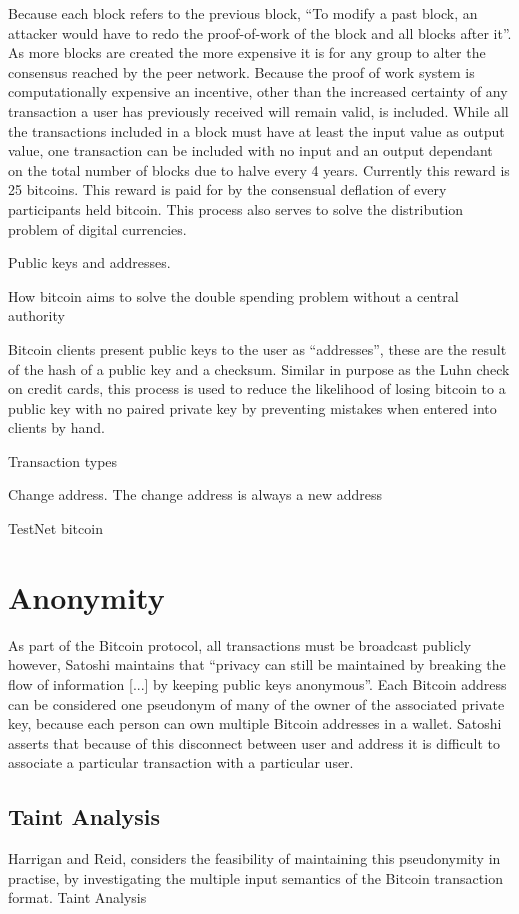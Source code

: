 Because each block refers to the previous block, “To modify a past block, an attacker would have to redo the proof-of-work of the block and all blocks after it”.  As more blocks are created the more expensive it is for any group to alter the consensus reached by the peer network.  Because the proof of work system is computationally expensive an incentive, other than the increased certainty of any transaction a user has previously received will remain valid, is included.  While all the transactions included in a block must have at least the input value as output value, one transaction can be included with no input and an output dependant on the total number of blocks due to halve every 4 years. Currently this reward is 25 bitcoins. This reward is paid for by the consensual deflation of every participants held bitcoin. This process also serves to solve the distribution problem of digital currencies.


    Public keys and addresses.

    How bitcoin aims to solve the double spending problem without a central authority

    Bitcoin clients present public keys to the user as “addresses”, these are the result of the hash of a public key and a checksum. Similar in purpose as the Luhn check on credit cards, this process is used to reduce the likelihood of losing bitcoin to a public key with no paired private key by preventing mistakes when entered into clients by hand.

    Transaction types

    Change address. The change address is always a new address

    TestNet bitcoin

\section{Anonymity}
As part of the Bitcoin protocol, all transactions must be broadcast publicly however, Satoshi maintains that “privacy can still be maintained by breaking the flow of information [...] by keeping public keys anonymous”.  Each Bitcoin address can be considered one pseudonym of many of the owner of the associated private key, because each person can own multiple Bitcoin addresses in a wallet. Satoshi asserts that because of this disconnect between user and address it is difficult to associate a particular transaction with a particular user.

\subsection{Taint Analysis}
Harrigan and Reid, considers the feasibility of maintaining this pseudonymity in practise, by investigating the multiple input semantics of the Bitcoin transaction format.
Taint Analysis

